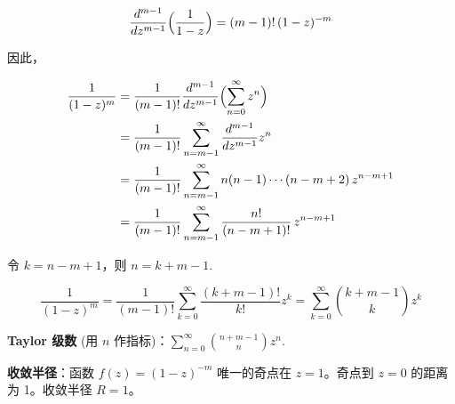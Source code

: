 \begin{question}
\begin{solution}
\begin{enumerate}
    \[
    \frac{d^{m-1}}{dz^{m-1}}\Bigl(\frac1{1-z}\Bigr) = (m-1)!\,(1-z)^{-m}
    \]

    因此，

    \[
    \begin{aligned}
    \frac1{(1-z)^m} &= \frac1{(m-1)!}\frac{d^{m-1}}{dz^{m-1}}\Bigl(\sum_{n=0}^{\infty} z^n\Bigr) \\
    &= \frac1{(m-1)!}\sum_{n=m-1}^{\infty} \frac{d^{m-1}}{dz^{m-1}}z^n \\
    &= \frac1{(m-1)!}\sum_{n=m-1}^{\infty} n(n-1)\cdots(n-m+2)\,z^{n-m+1} \\
    &= \frac1{(m-1)!}\sum_{n=m-1}^{\infty} \frac{n!}{(n-m+1)!}\,z^{n-m+1}
    \end{aligned}
    \]

    令 \(k=n-m+1\)，则 \(n=k+m-1\).

    \[
    \frac1{(1-z)^m} = \frac1{(m-1)!}\sum_{k=0}^{\infty} \frac{(k+m-1)!}{k!}z^k = \sum_{k=0}^{\infty} \binom{k+m-1}{k} z^k
    \]

    \textbf{Taylor 级数} (用 \(n\) 作指标)：\(\displaystyle\sum_{n=0}^{\infty} \binom{n+m-1}{n} z^n\).

    \textbf{收敛半径}：函数 \(f(z)=(1-z)^{-m}\) 唯一的奇点在 \(z=1\)。奇点到 \(z=0\) 的距离为 1。收敛半径 \(R=1\)。
\end{enumerate}
\end{solution}
\end{question}
